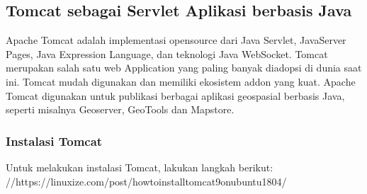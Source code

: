 \documentclass[letterpaper,10pt,english]{sphinxmanual}
\begin{document}
\subsection{Tomcat sebagai Servlet Aplikasi berbasis Java}
\label{\detokenize{sesi1/linuxserver:tomcat-sebagai-servlet-aplikasi-berbasis-java}}
Apache Tomcat adalah implementasi open\sphinxhyphen{}source dari Java Servlet, JavaServer Pages, Java Expression Language, dan teknologi Java WebSocket. Tomcat merupakan salah satu web Application yang paling banyak diadopsi di dunia saat ini. Tomcat mudah digunakan dan memiliki ekosistem add\sphinxhyphen{}on yang kuat. Apache Tomcat digunakan untuk publikasi berbagai aplikasi geospasial berbasis Java, seperti misalnya Geoserver, GeoTools dan Mapstore.


\subsubsection{Instalasi Tomcat}
\label{\detokenize{sesi1/linuxserver:instalasi-tomcat}}
Untuk melakukan instalasi Tomcat, lakukan langkah berikut:
//https://linuxize.com/post/how\sphinxhyphen{}to\sphinxhyphen{}install\sphinxhyphen{}tomcat\sphinxhyphen{}9\sphinxhyphen{}on\sphinxhyphen{}ubuntu\sphinxhyphen{}18\sphinxhyphen{}04/
\end{document}
